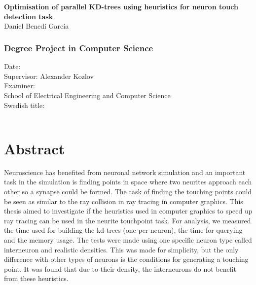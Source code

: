 \newpage
\thispagestyle{plain}
~\\
\begin{minipage}[b]{0.25\textwidth}
~\\
\end{minipage}
\begin{minipage}{0.65\textwidth}
\begin{flushleft}
{\fontsize{28}{24}\bf\sffamily Optimisation of parallel KD-trees using heuristics for neuron touch detection task\\}
\vspace{3cm}
{\fontsize{16}{18}\sffamily Daniel Benedí García}\\
\end{flushleft}
\end{minipage}
\vfill
{ 
	\subsection*{Degree Project in Computer Science}
	Date: \\
	Supervisor: Alexander Kozlov \\
	Examiner: \\
	School of Electrical Engineering and Computer Science \\
	Swedish title: \\
	~
}


\newpage
\thispagestyle{plain}
\chapter*{Abstract}
Neuroscience has benefited from neuronal network simulation and an important task in the simulation is finding points in space where two neurites approach each other so a synapse could be formed. The task of finding the touching points could be seen as similar to the ray collision in ray tracing in computer graphics. This thesis aimed to investigate if the heuristics used in computer graphics to speed up ray tracing can be used in the neurite touchpoint task. For analysis, we measured the time used for building the kd-trees (one per neuron), the time for querying and the memory usage. The tests were made using one specific neuron type called interneuron and realistic densities. This was made for simplicity, but the only difference with other types of neurons is the conditions for generating a touching point. It was found that due to their density, the interneurons do not benefit from these heuristics.


